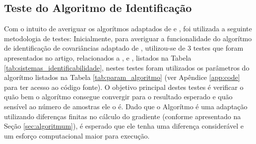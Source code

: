 \documentclass[journal]{IEEEtran}
\begin{document}
\subsection{Teste do Algoritmo de Identificação}

Com o intuito de averiguar os algorítmos adaptados de \cite{zhang2020} e \cite{falek2020}, foi utilizada a seguinte metodologia de testes: Inicialmente, para averiguar a funcionalidade do algorítmo de identificação de covariâncias adaptado de \cite{zhang2020}, utilizou-se de 3 testes que foram apresentados no artigo, relacionados a \cite{Neethling1974}, \cite{Odelson2006} e \cite{Mehra1970}, listados na Tabela \ref{tab:sistemas_identificabilidade}, nestes testes foram utilizados os parâmetros do algorítmo listados na Tabela \ref{tab:param_algoritmo} (ver Apêndice \ref{app:code} para ter acesso ao código fonte). O objetivo principal destes testes é verificar o quão bem o algorítmo consegue convergir para o resultado esperado e quão sensível ao número de amostras ele o é. Dado que o Algorítmo é uma adaptação utilizando diferenças finitas no cálculo do gradiente (conforme apresentado na Seção \ref{sec:algoritmum}), é esperado que ele tenha uma diferença considerável e um esforço computacional maior para execução.
\end{document}
